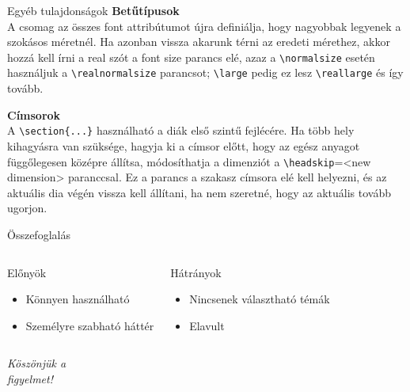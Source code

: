 \documentclass{beamer}
\begin{document}
\begin{frame}[fragile]{Egyéb tulajdonságok}
\large \textbf{Betűtípusok} \\
\normalsize
A csomag az összes font attribútumot újra definiálja, hogy nagyobbak legyenek a szokásos méretnél.
Ha azonban vissza akarunk térni az eredeti mérethez, akkor hozzá kell írni a real szót a font size parancs elé, azaz a \color{red}\verb|\normalsize| \color{black}esetén használjuk a \color{red}\verb|\realnormalsize| \color{black}parancsot; \color{red}\verb|\large| \color{black}pedig ez lesz \color{red}\verb|\reallarge| \color{black}és így tovább.

\large \textbf{Címsorok} \\
\normalsize
A \color{red}\verb|\section{...}| \color{black}használható a diák első szintű fejlécére. Ha több hely kihagyásra van szüksége, hagyja ki a címsor előtt, hogy az egész anyagot függőlegesen középre állítsa, módosíthatja a dimenziót a \color{red}\verb|\headskip|={<new dimension>} \color{black} paranccsal. Ez a parancs a szakasz címsora elé kell helyezni, és az aktuális dia végén vissza kell állítani, ha nem szeretné, hogy az aktuális tovább ugorjon.


\end{frame}


\begin{frame}[fragile]{Összefoglalás}
\begin{columns}[T]
\begin{block}{\color{green}Előnyök}
\begin{itemize}
\item Könnyen használható
\item Személyre szabható háttér
\end{itemize}

\end{block}
\begin{block}{\color{red}Hátrányok}

\begin{itemize}
\item Nincsenek választható témák
\item Elavult
\end{itemize}
\end{block}

\end{columns}
\end{frame}



\begin{frame}
\centering \Large
  \emph{Köszönjük a \\ figyelmet!}
\end{frame}
\end{document}
